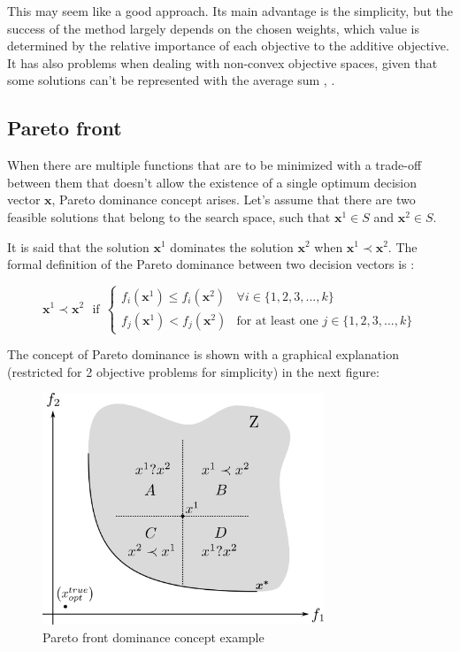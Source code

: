     
    This may seem like a good approach. Its main advantage is the simplicity, but the success of the method largely depends on the chosen weights, which value is determined by the relative importance of each objective to the additive objective. It has also problems when dealing with non-convex objective spaces, given that some solutions can't be represented with the average sum \cite{jakob2014pareto}, \cite{fonseca1995overview}.

\subsection{Pareto front}

    When there are multiple functions that are to be minimized with a trade-off between them that doesn't allow the existence of a single optimum decision vector $\bm{x}$, Pareto dominance concept arises. Let's assume that there are two feasible solutions that belong to the search space, such that $\bm{x}^1\in S$ and $\bm{x}^2\in S$. 
    
    \newpage
    
    It is said that the solution $\bm{x}^1$ dominates the solution $\bm{x}^2$ when $\bm{x}^1 \prec \bm{x}^2$. The formal definition of the Pareto dominance between two decision vectors is \cite{collette2013multiobjective}:
    
    \begin{equation}
        \bm{x}^1 \prec \bm{x}^2\ \ \ \textrm{if} \ \ \left\{
        \begin{array}{rl}
            f_i(\bm{x}^1) \leq f_i(\bm{x}^2)&  \forall i \in \{1,2,3,...,k\}\\
            f_j(\bm{x}^1) < f_j(\bm{x}^2) & \textrm{for at least one } j \in \{1,2,3,...,k\} 
        \end{array} \right.
        \label{eq:ParetoDominance}
    \end{equation}
    
    The concept of Pareto dominance is shown with a graphical explanation (restricted for 2 objective problems for simplicity) in the next figure:
    
    \begin{figure}[h!]
        \centering
        \includegraphics[width=0.75\textwidth]{Figures/2/paretoFront4cuad.png}
        \caption{Pareto front dominance concept example}
        \label{fig:4cuad}
    \end{figure}
    
